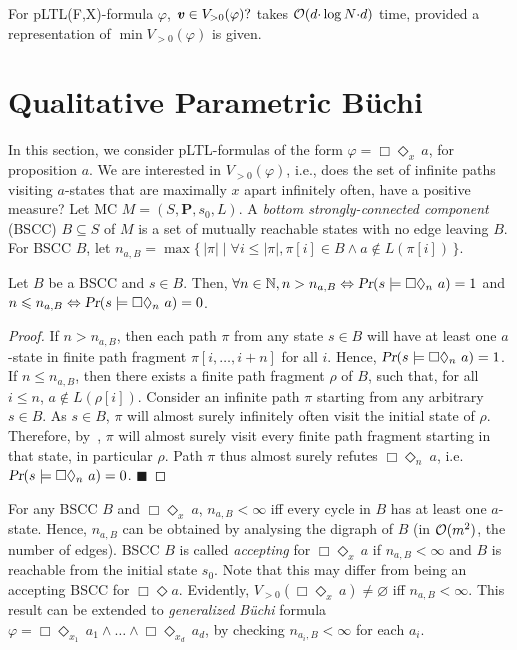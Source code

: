 \documentclass{llncs}
\renewcommand{\Pr}{\mbox{\rm Pr}}
\renewcommand{\Pr}{\mbox{\sl Pr}}
\def\bfP{\mathbf{P}}
\newcommand{\set}[1]{\{ \, #1 \, \}}
\renewcommand{\leq}{\leqslant}
\renewcommand{\emptyset}{\varnothing}
\renewcommand{\a}[1]{\textbf{\textit{#1}}}
\newcommand{\de}{\Diamond}
\begin{document}
\begin{proposition}
For pLTL(F,X)-formula $\varphi$, ${ {\a v}} \in V_{>0}(\varphi)?$ takes ${\cal O}(d{\cdot}\log N{\cdot}d)$ time, provided a representation of $\min V_{>0}(\varphi)$ is given.
\end{proposition}

\section{Qualitative Parametric B\"uchi}
\label{sec:parambuechi}

In this section, we consider pLTL-formulas of the form $\varphi = \Box\de_x \, a$, for proposition $a$. 
We are interested in $V_{>0}(\varphi)$, i.e., does the set of infinite paths visiting $a$-states that are maximally $x$ apart infinitely often, have a positive measure?
Let MC $M = (S, \bfP, s_0, L)$. 
A \emph{bottom strongly-connected component} (BSCC) $B \subseteq S$ of $M$ is a set of mutually reachable states with no edge leaving $B$. 
For BSCC $B$, let $n_{a,B} = \max\set{ |\pi| \mid \forall i \leq |\pi|, \pi[i] \in B \wedge a \notin L(\pi[i])}$. 


\begin{proposition}\label{buchi}
Let $B$ be a BSCC and $s \in B$.  Then, $\forall n\in\mathbb{N}, n > n_{a,B} \Leftrightarrow \Pr(s\models \Box\de_n\ a) =1$ and $n \leq n_{a,B} \Leftrightarrow \Pr(s\models \Box\de_n\ a) =0$.
\end{proposition}
\begin{proof}
If $n > n_{a,B}$, then each path $\pi$ from any state $s \in B$ will have at least one $a$-state in finite path fragment $\pi[i,\hdots,i{+}n]$ for all $i$. 
Hence, $\Pr(s\models\Box\de_n \ a) =1$. 
If $n\leq n_{a,B}$, then there exists a finite path fragment $\rho$ of $B$, such that, for all $i \leq n$, $a \notin L(\rho[i])$. 
Consider an infinite path $\pi$ starting from any arbitrary $s \in B$. 
As $s \in B$, $\pi$ will almost surely infinitely often visit the initial state of $\rho$.
Therefore, by~\cite[Th.10.25]{DBLP:books/daglib/0020348}, $\pi$ will almost surely visit every finite path fragment starting in that state, in particular $\rho$.
Path $\pi$ thus almost surely refutes $\Box\de_n\  a$, i.e. $\Pr(s\models \Box\de_n\ a) =0$.
\hfill $\blacksquare$ \end{proof}

\noindent
For any BSCC $B$ and $\Box\de_x\ a$, $n_{a,B}<\infty$ iff every cycle in $B$ has at least one $a$-state.
Hence, $n_{a,B}$ can be obtained by analysing the digraph of $B$ (in ${\cal O}(m^2)$, the number of edges).
BSCC $B$ is called \emph{accepting} for $\Box\de_x \, a$ if $n_{a,B}<\infty$ and $B$ is reachable from the initial state $s_0$. 
Note that this may differ from being an accepting BSCC for $\Box\de a$.
Evidently, $V_{>0}(\pmb\Box\de_x \,a) \neq \emptyset$ iff $n_{a,B} < \infty$. 
This result can be extended to \emph{generalized B\"uchi} formula
$\varphi = \Box\de_{x_1} \, a_1 \wedge \hdots \wedge \Box\de_{x_d} \, a_d$, by checking $n_{a_i,B}< \infty$ for each $a_i$. 
\end{document}
